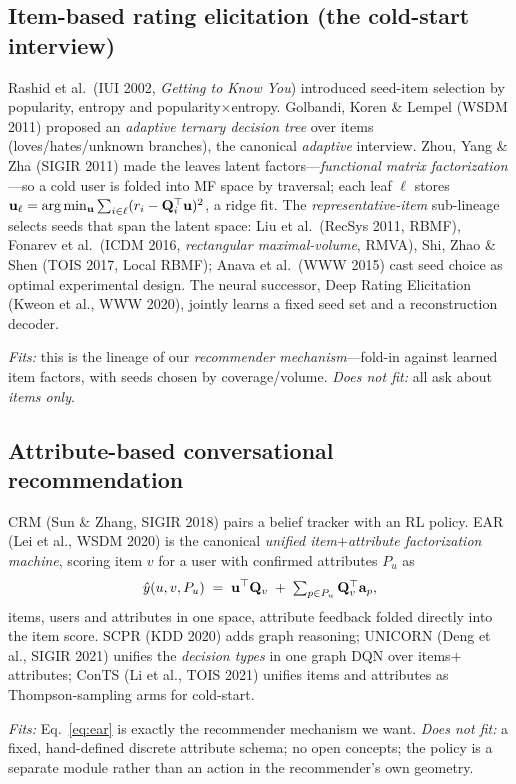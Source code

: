 \subsection{Item-based rating elicitation (the cold-start interview)}
Rashid et al.\ (IUI 2002, \emph{Getting to Know You}) introduced seed-item selection by popularity, entropy and
popularity$\times$entropy. Golbandi, Koren \& Lempel (WSDM 2011) proposed an \emph{adaptive ternary decision
tree} over items (loves/hates/unknown branches), the canonical \emph{adaptive} interview. Zhou, Yang \& Zha
(SIGIR 2011) made the leaves latent factors---\emph{functional matrix factorization}---so a cold user is folded
into MF space by traversal; each leaf $\ell$ stores $\mathbf{u}_\ell=\arg\min_{\mathbf{u}}\sum_{i\in\ell}(r_i-\mathbf{Q}_i^\top\mathbf{u})^2$, a
ridge fit. The \emph{representative-item} sub-lineage selects seeds that span the latent space: Liu et al.\
(RecSys 2011, RBMF), Fonarev et al.\ (ICDM 2016, \emph{rectangular maximal-volume}, RMVA), Shi, Zhao \& Shen
(TOIS 2017, Local RBMF); Anava et al.\ (WWW 2015) cast seed choice as optimal experimental design. The neural
successor, Deep Rating Elicitation (Kweon et al., WWW 2020), jointly learns a fixed seed set and a reconstruction
decoder.

\emph{Fits:} this is the lineage of our \emph{recommender mechanism}---fold-in against learned item factors, with
seeds chosen by coverage/volume. \emph{Does not fit:} all ask about \emph{items only}.

\subsection{Attribute-based conversational recommendation}
CRM (Sun \& Zhang, SIGIR 2018) pairs a belief tracker with an RL policy. EAR (Lei et al., WSDM 2020) is the
canonical \emph{unified item$+$attribute factorization machine}, scoring item $v$ for a user with confirmed
attributes $P_u$ as
\begin{equation}\label{eq:ear}
  \hat y(u,v,P_u) \;=\; \mathbf{u}^\top \mathbf{Q}_v \;+\; \textstyle\sum_{p\in P_u}\mathbf{Q}_v^\top \mathbf{a}_p,
\end{equation}
items, users and attributes in one space, attribute feedback folded directly into the item score. SCPR (KDD 2020)
adds graph reasoning; UNICORN (Deng et al., SIGIR 2021) unifies the \emph{decision types} in one graph DQN over
items$+$attributes; ConTS (Li et al., TOIS 2021) unifies items and attributes as Thompson-sampling arms for
cold-start.

\emph{Fits:} Eq.~\eqref{eq:ear} is exactly the recommender mechanism we want. \emph{Does not fit:} a fixed,
hand-defined discrete attribute schema; no open concepts; the policy is a separate module rather than an action in
the recommender's own geometry.

